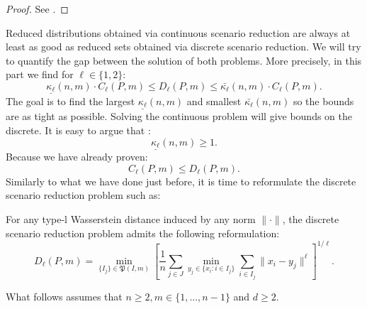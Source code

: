 \documentclass{amsart}
\begin{document}
\begin{proof}
    See \cite[Theorem 2 and 3]{rujeerapaiboon_scenario_2022}.
\end{proof}
Reduced distributions obtained via continuous scenario reduction are always at least as good as reduced sets obtained via discrete scenario reduction. We will try to quantify the gap between the solution of both problems. More precisely, in this part we find for $\ell\in\{1,2\}$: 
$$\underline{\kappa_\ell}\left(n,m\right)\cdot C_\ell\left(P,m\right)\leq D_\ell\left(P,m\right)\leq \bar{\kappa_\ell}\left(n,m\right)\cdot C_\ell\left(P,m\right).$$
The goal is to find the largest $\underline{\kappa_\ell}\left(n,m\right)$ and smallest $\bar{\kappa_\ell}\left(n,m\right)$ so the bounds are as tight as possible. Solving the continuous problem will give bounds on the discrete. It is easy to argue that : 
$$
\underline{\kappa_\ell}\left(n,m\right)\geq1.
$$
Because we have already proven: 
$$
C_\ell\left(P,m\right)\leq D_\ell\left(P,m\right).
$$
Similarly to what we have done just before, it is time to reformulate the discrete scenario reduction problem such as:
\begin{theorem}\label{reformulation 2}
    For any type-l Wasserstein distance induced by any norm $\lVert\cdot\rVert$, the discrete scenario reduction problem admits the following reformulation: 
    $$
    D_\ell\left(P,m\right)=\min_{\{I_j\}\in\mathfrak{P}\left(I,m\right)}\left[ \frac{1}{n}\sum_{j\in J}\min_{y_j\in\{x_i : i\in I_j\}}\sum_{i\in I_j}\lVert x_i-y_j\rVert^\ell\right]^{1/\ell}.
    $$
\end{theorem}

\noindent What follows assumes that $n\geq2, m\in\{1,...,n-1\}$ and $d\geq2.$ \\
\end{document}
